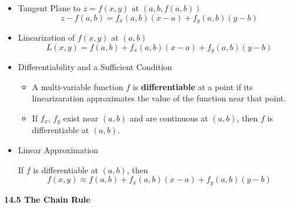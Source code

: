 \begin{itemize}

  \item Tangent Plane to $z=f(x,y)$ at $(a,b,f(a,b))$
    \[
      z-f(a,b)=f_x(a,b)(x-a)+f_y(a,b)(y-b)
    \]

  \item Linearization of $f(x,y)$ at $(a,b)$
    \[
      L(x,y) = f(a,b)+f_x(a,b)(x-a)+f_y(a,b)(y-b)
    \]

  \item Differentiability and a Sufficient Condition
    \begin{itemize}
      \item A multi-variable function $f$ is \textbf{differentiable} at a point if its linearizaration approximates the value of the function near that point.
      \item If $f_x$, $f_y$ exist near $(a,b)$ and are continuous at $(a,b)$, then $f$ is differentiable at $(a,b)$.
    \end{itemize}

  \item Linear Approximation

    If $f$ is differentiable at $(a,b)$, then
      \[
        f(x,y) \approx f(a,b)+f_x(a,b)(x-a)+f_y(a,b)(y-b)
      \]

\end{itemize}

\newpage

\centerline{\bf 14.5 The Chain Rule}

